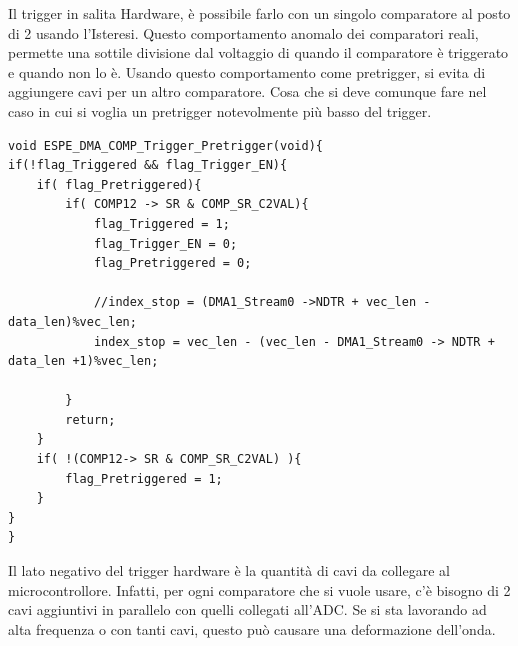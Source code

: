 Il trigger in salita Hardware, è possibile farlo con un singolo comparatore al posto di 2 usando l'Isteresi. Questo comportamento anomalo dei comparatori reali, permette una sottile divisione dal voltaggio di quando il comparatore è triggerato e quando non lo è. Usando questo comportamento come pretrigger, si evita di aggiungere cavi per un altro comparatore. Cosa che si deve comunque fare nel caso in cui si voglia un pretrigger notevolmente più basso del trigger.

\noindent
\begin{verbatim}
void ESPE_DMA_COMP_Trigger_Pretrigger(void){
if(!flag_Triggered && flag_Trigger_EN){
    if( flag_Pretriggered){
        if( COMP12 -> SR & COMP_SR_C2VAL){
            flag_Triggered = 1;
            flag_Trigger_EN = 0;
            flag_Pretriggered = 0;

            //index_stop = (DMA1_Stream0 ->NDTR + vec_len - data_len)%vec_len;
            index_stop = vec_len - (vec_len - DMA1_Stream0 -> NDTR + data_len +1)%vec_len;

        }
        return;
    }
    if( !(COMP12-> SR & COMP_SR_C2VAL) ){
        flag_Pretriggered = 1;
    }
}
}
\end{verbatim}

Il lato negativo del trigger hardware è la quantità di cavi da collegare al microcontrollore. Infatti, per ogni comparatore che si vuole usare, c'è bisogno di 2 cavi aggiuntivi in parallelo con quelli collegati all'ADC. Se si sta lavorando ad alta frequenza o con tanti cavi, questo può causare una deformazione dell'onda.